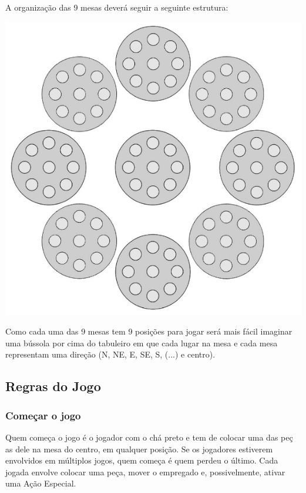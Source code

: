 \documentclass[a4paper]{article}
\begin{document}
A organização das 9 mesas deverá seguir a seguinte estrutura: \newline \newline
\begin{center}
\includegraphics[scale=0.5]{board-setup.png}\linebreak\linebreak
\end{center}

Como cada uma das 9 mesas tem 9 posições para jogar será mais fácil imaginar uma bússola por cima do tabuleiro em que cada lugar na mesa e cada mesa representam uma direção (N, NE, E, SE, S, (...) e centro). 

\subsection{Regras do Jogo}
\subsubsection{Começar o jogo}
Quem começa o jogo é o jogador com o chá preto e tem de colocar uma das peç
as dele na mesa do centro, em qualquer posição. Se os jogadores estiverem envolvidos em múltiplos jogos, quem começa é quem perdeu o último. Cada jogada envolve colocar uma peça, mover o empregado e, possivelmente, ativar uma Ação Especial.
\end{document}
